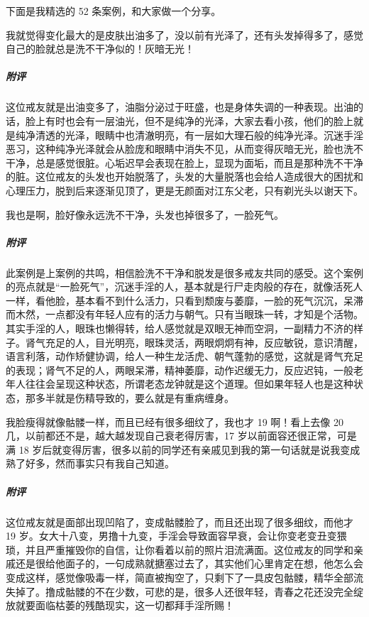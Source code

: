 下面是我精选的 52 条案例，和大家做一个分享。

\begin{case}[变丑]
    我就觉得变化最大的是皮肤出油多了，没以前有光泽了，还有头发掉得多了，感觉自己的脸就总是洗不干净似的！灰暗无光！
    \subparagraph{附评} 这位戒友就是出油变多了，油脂分泌过于旺盛，也是身体失调的一种表现。出油的话，脸上有时也会有一层油光，但不是纯净的光泽，大家去看小孩，他们的脸上就是纯净清透的光泽，眼睛中也清澈明亮，有一层如大理石般的纯净光泽。沉迷手淫恶习，这种纯净光泽就会从脸庞和眼睛中消失不见，从而变得灰暗无光，脸也洗不干净，总是感觉很脏。心垢迟早会表现在脸上，显现为面垢，而且是那种洗不干净的脏。这位戒友的头发也开始脱落了，头发的大量脱落也会给人造成很大的困扰和心理压力，脱到后来逐渐见顶了，更是无颜面对江东父老，只有剃光头以谢天下。
\end{case}

\begin{case}[变丑]
    我也是啊，脸好像永远洗不干净，头发也掉很多了，一脸死气。
    \subparagraph{附评} 此案例是上案例的共鸣，相信脸洗不干净和脱发是很多戒友共同的感受。这个案例的亮点就是“一脸死气”，沉迷手淫的人，基本就是行尸走肉般的存在，就像活死人一样，看他脸，基本看不到什么活力，只看到颓废与萎靡，一脸的死气沉沉，呆滞而木然，一点都没有年轻人应有的活力与朝气。只有当眼珠一转，才知是个活物。其实手淫的人，眼珠也懒得转，给人感觉就是双眼无神而空洞，一副精力不济的样子。肾气充足的人，目光明亮，眼珠灵活，两眼炯炯有神，反应敏锐，意识清醒，语言利落，动作矫健协调，给人一种生龙活虎、朝气蓬勃的感觉，这就是肾气充足的表现；肾气不足的人，两眼呆滞，精神萎靡，动作迟缓无力，反应迟钝，一般老年人往往会呈现这种状态，所谓老态龙钟就是这个道理。但如果年轻人也是这种状态，那多半就是伤精导致的，要么就是有重病缠身。
\end{case}

\begin{case}[变丑]
    我脸瘦得就像骷髅一样，而且已经有很多细纹了，我也才 19 啊！看上去像 20 几，以前都还不是，越大越发现自己衰老得厉害，17 岁以前面容还很正常，可是满 18 岁后就变得厉害，很多以前的同学还有亲戚见到我的第一句话就是说我变成熟了好多，然而事实只有我自己知道。
    \subparagraph{附评} 这位戒友就是面部出现凹陷了，变成骷髅脸了，而且还出现了很多细纹，而他才 19 岁。女大十八变，男撸十九变，手淫会导致面容早衰，会让你变老变丑变猥琐，并且严重摧毁你的自信，让你看着以前的照片泪流满面。这位戒友的同学和亲戚还是很给他面子的，一句成熟就搪塞过去了，其实他们心里肯定在想，他怎么会变成这样，感觉像吸毒一样，简直被掏空了，只剩下了一具皮包骷髅，精华全部流失掉了。撸成骷髅的不在少数，可悲的是，很多人还很年轻，青春之花还没完全绽放就要面临枯萎的残酷现实，这一切都拜手淫所赐！
\end{case}

